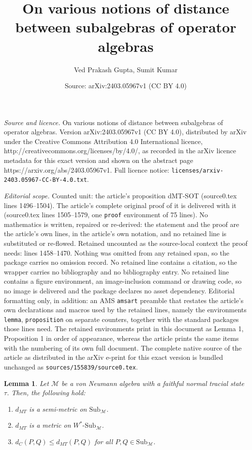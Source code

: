 \documentclass[10pt,a4paper]{amsart}
\title{On various notions of distance between subalgebras of operator algebras}
\author{Ved Prakash Gupta, Sumit Kumar}
\date{Source: arXiv:2403.05967v1 (CC BY 4.0)}
\newtheorem{lemma}{Lemma}
\newcommand{\mM}{\mathcal{M}}
\begin{document}
\maketitle

\noindent\emph{Source and licence.} On various notions of distance between subalgebras of operator algebras. Version arXiv:2403.05967v1 (CC BY 4.0), distributed by arXiv under the Creative Commons Attribution 4.0 International licence, http://creativecommons.org/licenses/by/4.0/, as recorded in the arXiv licence metadata for this exact version and shown on the abstract page https://arxiv.org/abs/2403.05967v1. Full licence notice: \texttt{licenses/arxiv-2403.05967-CC-BY-4.0.txt}.\par\smallskip

\noindent\textit{Editorial scope.} Counted unit: the article's proposition dMT-SOT (source0.tex lines 1496--1504). The article's complete original proof of it is delivered with it (source0.tex lines 1505--1579, one \texttt{proof} environment of 75 lines). No mathematics is written, repaired or re-derived: the statement and the proof are the article's own lines, in the article's own notation, and no retained line is substituted or re-flowed.  Retained uncounted as the source-local context the proof needs: lines 1458--1470.  Nothing was omitted from any retained span, so the package carries no omission record.  No retained line contains a citation, so the wrapper carries no bibliography and no bibliography entry.  No retained line contains a figure environment, an image-inclusion command or drawing code, so no image is delivered and the package declares no asset dependency.  Editorial formatting only, in addition: an AMS \texttt{amsart} preamble that restates the article's own declarations and macros used by the retained lines, namely the environments \texttt{lemma}, \texttt{proposition} on separate counters, together with the standard packages those lines need.  The retained environments print in this document as Lemma 1, Proposition 1 in order of appearance, whereas the article prints the same items with the numbering of its own full document.  The complete native source of the article as distributed in the arXiv e-print for this exact version is bundled unchanged as \texttt{sources/155839/source0.tex}.
\begin{lemma}\label{dMT-facts}
  Let $\mM$ be a von Neumann algebra with a  faithful normal
  tracial state $\tau$. Then, the following hold:
\begin{enumerate}
\item  $d_{MT}$  is a semi-metric on $\mathrm{Sub}_{\mM}$.

\item $d_{MT}$ is a metric on $W^*\text{-}\mathrm{Sub}_{\mM}$. 

\item \(
d_C(P,Q)\leq d_{MT}(P,Q) 
\)    for all $P, Q \in \text{Sub}_{\mM}$.
 \end{enumerate}
\end{lemma}
\end{document}

